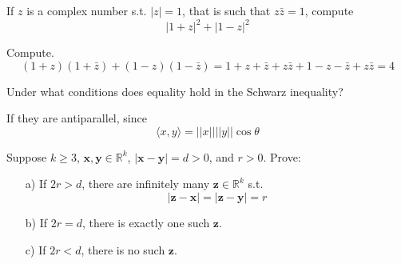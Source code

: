   \begin{exercise}[Rudin 1.14]
    If $z$ is a complex number s.t. $|z| = 1$, that is such that $z \bar{z} = 1$, compute 
    \begin{equation}
      |1 + z|^2 + |1 - z|^2
    \end{equation}
  \end{exercise}
  \begin{solution}
    Compute. 
    \begin{equation}
      (1 + z) (1 + \bar{z}) + (1 - z) (1 - \bar{z}) = 1 + z + \bar{z} + z \bar{z} + 1 - z - \bar{z} + z \bar{z} = 4
    \end{equation}
  \end{solution}

  \begin{exercise}[Rudin 1.15]
    Under what conditions does equality hold in the Schwarz inequality? 
  \end{exercise}
  \begin{solution}
    If they are antiparallel, since 
    \begin{equation}
      \langle x, y \rangle = ||x || ||y || \cos{\theta}
    \end{equation}
  \end{solution}

  \begin{exercise}[Rudin 1.16]
    Suppose $k \geq 3$, $\mathbf{x}, \mathbf{y} \in \mathbb{R}^k$, $|\mathbf{x} - \mathbf{y}| = d > 0$, and $r > 0$. Prove: 
    \begin{enumerate}
      \item[a)] If $2r > d$, there are infinitely many $\mathbf{z} \in \mathbb{R}^k$ s.t. 
      \[|\mathbf{z} - \mathbf{x}| = |\mathbf{z} - \mathbf{y}| = r\]
      \item[b)] If $2r = d$, there is exactly one such $\mathbf{z}$. 
      \item[c)] If $2r < d$, there is no such $\mathbf{z}$. 
    \end{enumerate}
  \end{exercise}
  \begin{solution}
    
  \end{solution}

